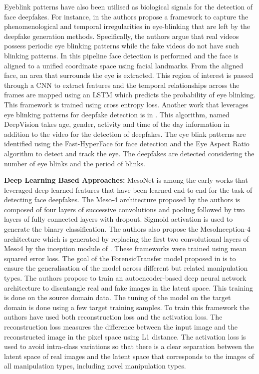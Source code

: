 Eyeblink patterns have also been utilised as biological signals for the detection of face deepfakes. For instance, in \cite{li2018exposing} the authors propose a framework to capture the phenomenological and temporal irregularities in eye-blinking that are left by the deepfake generation methods. Specifically, the authors argue that real videos possess periodic eye blinking patterns while the fake videos do not have such blinking patterns. In this pipeline face detection is performed and the face is aligned to a unified coordinate space using facial landmarks. From the aligned face, an area that surrounds the eye is extracted. This region of interest is passed through a CNN to extract features and the temporal relationships across the frames are mapped using an LSTM which predicts the probability of eye blinking. This framework is trained using cross entropy loss. Another work that leverages eye blinking patterns for deepfake detection is in \cite{jung2020deepvision}. This algorithm, named DeepVision takes age, gender, activity and time of the day information in addition to the video for the detection of deepfakes. The eye blink patterns are identified using the Fast-HyperFace \cite{ranjan2017hyperface} for face detection and the Eye Aspect Ratio algorithm \cite{cech2016real} to detect and track the eye. The deepfakes are detected considering the number of eye blinks and the period of blinks. 

\noindent\textbf{Deep Learning Based Approaches: } MesoNet is among the early works that leveraged deep learned features that have been learned end-to-end for the task of detecting face deepfakes. The Meso-4 architecture proposed by the authors is composed of four layers of successive convolutions and pooling followed by two layers of fully connected layers with dropout. Sigmoid activation is used to generate the binary classification. The authors also propose the MesoInception-4 architecture which is generated by replacing the first two convolutional layers of Meso4 by the inception module of \cite{szegedy2015going}. These frameworks were trained using mean squared error loss. The goal of the ForensicTransfer model proposed in \cite{cozzolino2018forensictransfer} is to ensure the generalisation of the model across different but related manipulation types. The authors propose to train an autoencoder-based deep neural network architecture to disentangle real and fake images in the latent space. This training is done on the source domain data. The tuning of the model on the target domain is done using a few target training samples. To train this framework the authors have used both reconstruction loss and the activation loss. The reconstruction loss measures the difference between the input image and the reconstructed image in the pixel space using L1 distance. The activation loss is used to avoid intra-class variations so that there is a clear separation between the latent space of real images and the latent space that corresponds to the images of all manipulation types, including novel manipulation types. 

